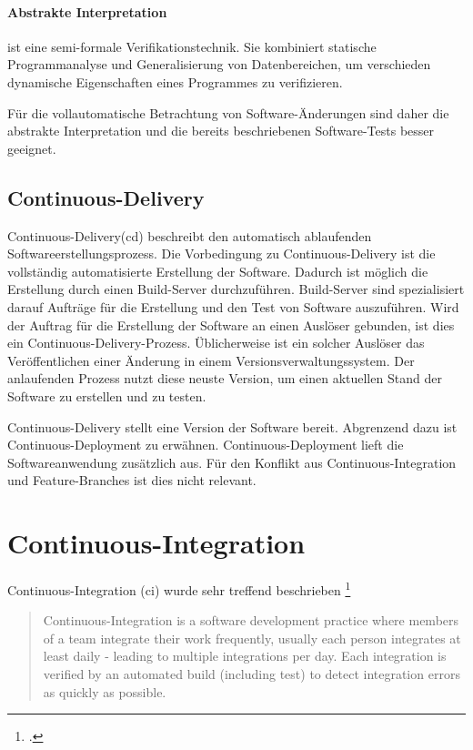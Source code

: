 \paragraph{Abstrakte Interpretation} ist eine semi-formale Verifikationstechnik. Sie kombiniert statische Programmanalyse und Generalisierung von Datenbereichen, um verschieden dynamische Eigenschaften eines Programmes zu verifizieren.

\vspace{1em}

Für die vollautomatische Betrachtung von Software-Änderungen sind daher die abstrakte Interpretation und die bereits beschriebenen Software-Tests besser geeignet.

\subsection{Continuous-Delivery}

Continuous-Delivery(\acs{cd}) beschreibt den automatisch ablaufenden Softwareerstellungsprozess. Die Vorbedingung zu Continuous-Delivery ist die vollständig automatisierte Erstellung der Software. Dadurch ist möglich die Erstellung durch einen Build-Server durchzuführen. Build-Server sind spezialisiert darauf Aufträge für die Erstellung und den Test von Software auszuführen. Wird der Auftrag für die Erstellung der Software an einen Auslöser gebunden, ist dies ein Continuous-Delivery-Prozess. Üblicherweise ist ein solcher Auslöser das Veröffentlichen einer Änderung in einem Versionsverwaltungssystem. Der anlaufenden Prozess nutzt diese neuste Version, um einen aktuellen Stand der Software zu erstellen und zu testen.

Continuous-Delivery stellt eine Version der Software bereit. Abgrenzend dazu ist Continuous-Deployment zu erwähnen. Continuous-Deployment lieft die Softwareanwendung zusätzlich aus. Für den Konflikt aus Continuous-Integration und Feature-Branches ist dies nicht relevant.

\section{Continuous-Integration}

Continuous-Integration (\acs{ci}) wurde sehr treffend beschrieben \footcite[vgl.][]{fowler2006}

\blockquote {Continuous-Integration is a software development practice where members of a team integrate their work frequently, usually each person integrates at least daily - leading to multiple integrations per day. Each integration is verified by an automated build (including test) to detect integration errors as quickly as possible.}

